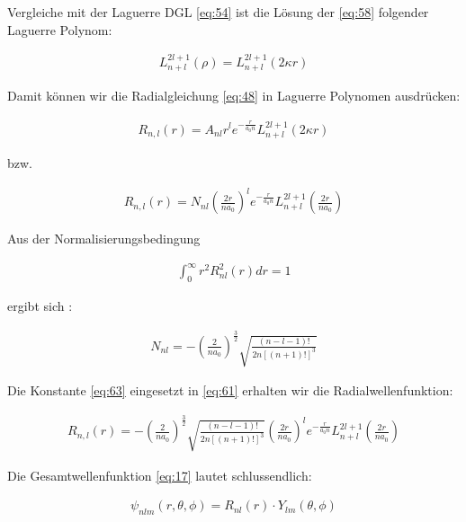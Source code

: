 Vergleiche mit der Laguerre DGL \eqref{eq:54} ist die Lösung der \eqref{eq:58} folgender Laguerre Polynom:

\begin{align}
  \label{eq:59}
  L^{2l+1}_{n+l}\left(\rho\right) = L^{2l+1}_{n+l}\left(2\kappa r \right)
\end{align}

Damit können wir die Radialgleichung \eqref{eq:48} in Laguerre Polynomen ausdrücken:


\begin{align}
  \label{eq:60}
  R_{n,l}(r) = A_{nl}r^{l}e^{-\frac{r}{a_0 n}} L^{2l+1}_{n+l}\left(2\kappa r \right)
\end{align}

bzw.

\begin{align}
  \label{eq:61}
   R_{n,l}(r) = N_{nl}\left(\frac{2r}{n a_0}\right)^{l}e^{-\frac{r}{a_0 n}} L^{2l+1}_{n+l}\left(\frac{2r}{n a_0}\right)
\end{align}

Aus der Normalisierungsbedingung 

\begin{align}
  \label{eq:62}
  \int^\infty_0 r^2 R^2_{nl} (r) dr = 1
\end{align}

ergibt sich :

\begin{align}
  \label{eq:63}
  N_{nl} = -\left(\frac{2}{na_0}\right)^{\frac{3}{2}}\sqrt{\frac{(n-l-1)!}{2n[(n+1)!]^3} }
\end{align}

Die Konstante \eqref{eq:63} eingesetzt in \eqref{eq:61} erhalten wir die Radialwellenfunktion:

\begin{align}
  \label{eq:64}
 \boxed{ R_{n,l}(r) = -\left(\frac{2}{na_0}\right)^{\frac{3}{2}}\sqrt{\frac{(n-l-1)!}{2n[(n+1)!]^3} } \left(\frac{2r}{n a_0}\right)^{l}e^{-\frac{r}{a_0 n}} L^{2l+1}_{n+l}\left(\frac{2r}{n a_0}\right)}
\end{align}

Die Gesamtwellenfunktion \eqref{eq:17} lautet schlussendlich:


\begin{align}
  \label{eq:65}
  \psi_{nlm}(r,\theta,\phi) = R_{nl}(r)\cdot Y_{lm}(\theta,\phi)
\end{align}









